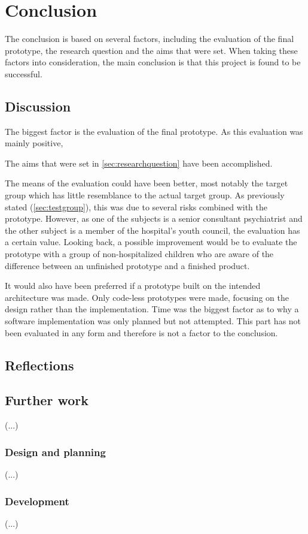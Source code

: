 \chapter{Conclusion}
\label{ch:conclusion}

The conclusion is based on several factors, including the evaluation of the final prototype, the research question and the aims that were set. When taking these factors into consideration, the main conclusion is that this project is found to be successful.

\section{Discussion}
\label{sec:discussion}


The biggest factor is the evaluation of the final prototype. As this evaluation was mainly positive, 



The aims that were set in \autoref{sec:researchquestion} have been accomplished. 

The means of the evaluation could have been better, most notably the target group which has little resemblance to the actual target group. As previously stated (\autoref{sec:testgroup}), this was due to several risks combined with the prototype. However, as one of the subjects is a senior consultant psychiatrist and the other subject is a member of the hospital's youth council, the evaluation has a certain value. Looking back, a possible improvement would be to evaluate the prototype with a group of non-hospitalized children who are aware of the difference between an unfinished prototype and a finished product.

It would also have been preferred if a prototype built on the intended architecture was made. Only code-less prototypes were made, focusing on the design rather than the implementation. Time was the biggest factor as to why a software implementation was only planned but not attempted. This part has not been evaluated in any form and therefore is not a factor to the conclusion.

\section{Reflections}
\label{sec:reflections}






\section{Further work}
\label{sec:furtherwork}

(...)

\subsection{Design and planning}

(...)

\subsection{Development}

(...)
